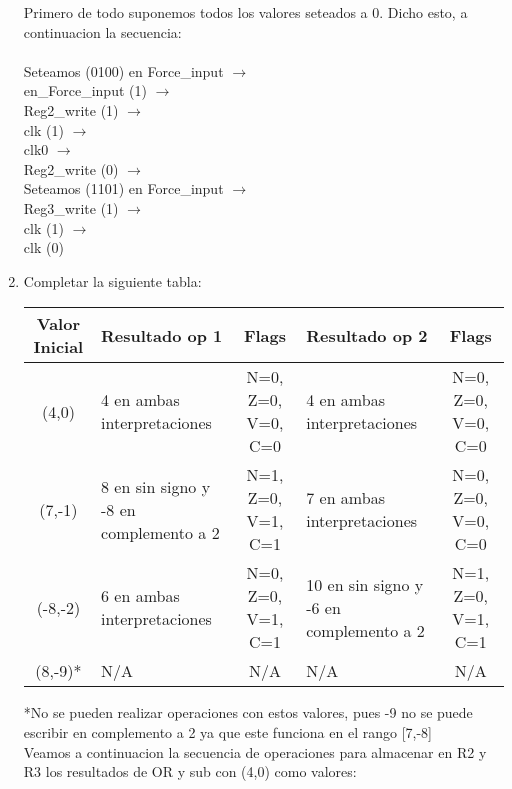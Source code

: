 \documentclass{article}
\begin{document}
\begin{enumerate}
    Primero de todo suponemos todos los valores seteados a 0. Dicho esto, a continuacion la secuencia:\\\\
    Seteamos (0100) en Force\_input $\rightarrow$\\
     en\_Force\_input (1) $\rightarrow$\\
    Reg2\_write (1) $\rightarrow$\\
    clk (1) $\rightarrow$\\ clk0 $\rightarrow$\\
    Reg2\_write (0) $\rightarrow$\\
    Seteamos (1101) en Force\_input $\rightarrow$\\
    Reg3\_write (1) $\rightarrow$\\
    clk (1) $\rightarrow$\\
    clk (0)
    \item Completar la siguiente tabla:
    \begin{center}{\renewcommand{\arraystretch}{1.5}
        \begin{tabular}{c || p{3.5cm} | c || p{4cm} | c }
            Valor Inicial & Resultado op 1 & Flags & Resultado op 2 & Flags \\ \hline
            (4,0) & 4 en ambas interpretaciones & N=0, Z=0, V=0, C=0& 4 en ambas interpretaciones & N=0, Z=0, V=0, C=0 \\
            (7,-1) & 8 en sin signo y -8 en complemento a 2& N=1, Z=0, V=1, C=1& 7 en ambas interpretaciones & N=0, Z=0, V=0, C=0\\
            (-8,-2) & 6 en ambas interpretaciones & N=0, Z=0, V=1, C=1 &10 en sin signo y -6 en complemento a 2 &        
            N=1, Z=0, V=1, C=1 \\
            (8,-9)* & N/A & N/A & N/A & N/A\\
        \end{tabular}}
    \end{center}
    *No se pueden realizar operaciones con estos valores, pues -9 no se puede escribir en complemento a 2 ya que este funciona en el rango [7,-8]\\

    Veamos a continuacion la secuencia de operaciones para almacenar en R2 y R3 los resultados de OR y sub con (4,0) como valores:


\end{enumerate}
\end{document}
